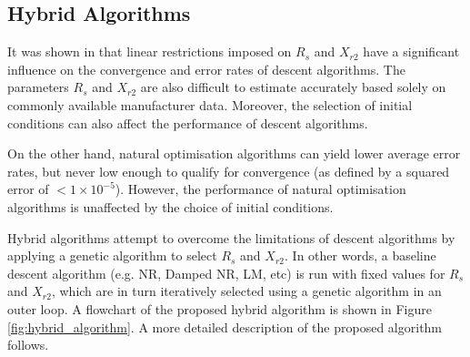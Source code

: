 \documentclass{article}
\begin{document}
\subsection{Hybrid Algorithms}
It was shown in \cite{susanto_2013} that linear restrictions imposed on $R_s$ and $X_{r2}$ have a significant influence on the convergence and error rates of descent algorithms. The parameters $R_s$ and $X_{r2}$  are also difficult to estimate accurately based solely on commonly available manufacturer data. Moreover, the selection of initial conditions can also affect the performance of descent algorithms.

On the other hand, natural optimisation algorithms can yield lower average error rates, but never low enough to qualify for convergence (as defined by a squared error of $<1 \times 10^{-5}$). However, the performance of natural optimisation algorithms is unaffected by the choice of initial conditions.

Hybrid algorithms attempt to overcome the limitations of descent algorithms by applying a genetic algorithm to select $R_s$ and $X_{r2}$. In other words, a baseline descent algorithm (e.g. NR, Damped NR, LM, etc) is run with fixed values for $R_s$ and $X_{r2}$, which are in turn iteratively selected using a genetic algorithm in an outer loop. A flowchart of the proposed hybrid algorithm is shown in Figure \ref{fig:hybrid_algorithm}. A more detailed description of the proposed algorithm follows.
\end{document}
